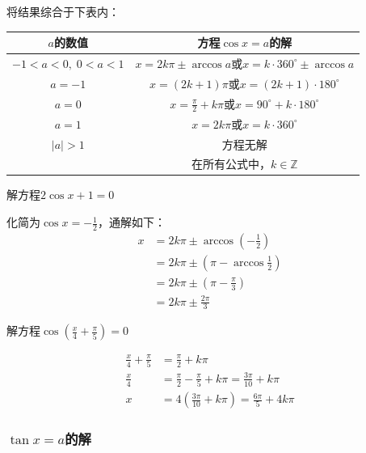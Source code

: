 将结果综合于下表内：
\begin{center}
    \begin{tabular}{c|c}
        \hline
    $a$的数值& 方程$\cos x=a$的解\\
        \hline
    $-1<a<0,\; 0<a<1$ & $x=2k\pi \pm \arccos a$或$x=k\cdot 360^{\circ}\pm \arccos a$\\
    $a=-1$& $x=(2k+1)\pi$或$x=(2k+1)\cdot 180^{\circ}$\\
    $a=0$&   $x=\frac{\pi}{2}+k\pi$或$x=90^{\circ}+k\cdot 180^{\circ}$\\
    $a=1$& $x=2k\pi$或$x=k\cdot 360^{\circ}$\\
    $|a|>1$ & 方程无解\\
        \hline
    & 在所有公式中，$k\in\mathbb{Z}$\\
        \hline
    \end{tabular}   
    \end{center}



\begin{example}
    解方程$2\cos x+1=0$
\end{example}

\begin{solution}
    化简为$\cos x=-\frac{1}{2}$，通解如下：
\[\begin{split}
    x&=2k\pi\pm\arccos\left(-\frac{1}{2}\right)\\
    &=2k\pi\pm \left(\pi-\arccos\frac{1}{2}\right)\\
    &=2k\pi\pm \left(\pi-\frac{\pi}{3}\right)\\
    &=2k\pi\pm \frac{2\pi}{3}
\end{split}\]
\end{solution}


\begin{example}
    解方程$\cos\left(\frac{x}{4}+\frac{\pi}{5}\right)=0$
\end{example}

\begin{solution}
    \[\begin{split}
        \frac{x}{4}+\frac{\pi}{5}&=\frac{\pi}{2}+k\pi\\
        \frac{x}{4}&=\frac{\pi}{2}-\frac{\pi}{5}+k\pi=\frac{3\pi}{10}+k\pi\\
        x&=4\left(\frac{3\pi}{10}+k\pi\right)=\frac{6\pi}{5}+4k\pi
    \end{split}
    \]
\end{solution}

\subsubsection{$\tan x=a$的解}

